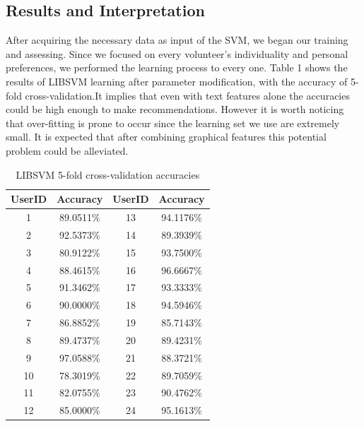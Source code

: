 \subsection{Results and Interpretation}
After acquiring the necessary data as input of the SVM, we began our training and assessing. Since we focused on every volunteer's individuality and personal preferences, we performed  the learning process to every one. 
Table 1 shows the results of LIBSVM learning after parameter modification, with the accuracy of 5-fold cross-validation.It implies that even with text features alone the accuracies could be high enough to make recommendations. However it is worth noticing that over-fitting is prone to occur since the learning set we use are extremely small. It is expected that after combining graphical features this potential problem could be alleviated. 

\begin{table}
  \centering  %
  \begin{tabular}{c c | c c} %
    \hline                        %
    UserID & Accuracy & UserID & Accuracy \\ [0.9ex] %
    \hline                  %
    1 & 89.0511\% & 13 & 94.1176\% \\
    2 & 92.5373\% & 14 & 89.3939\% \\
    3 & 80.9122\% & 15 & 93.7500\% \\
    4 & 88.4615\% & 16 & 96.6667\% \\
    5 & 91.3462\% & 17 & 93.3333\% \\
    6 & 90.0000\% & 18 & 94.5946\% \\
    7 & 86.8852\% & 19 & 85.7143\% \\
    8 & 89.4737\% & 20 & 89.4231\% \\
    9 & 97.0588\% & 21 & 88.3721\% \\
    10 & 78.3019\% & 22 & 89.7059\% \\
    11 & 82.0755\% & 23 & 90.4762\% \\
    12 & 85.0000\% & 24 & 95.1613\% \\[1ex]  
    \hline %
  \end{tabular}
  \caption{LIBSVM 5-fold cross-validation accuracies} %
  \label{table:nonlin} %
\end{table}
